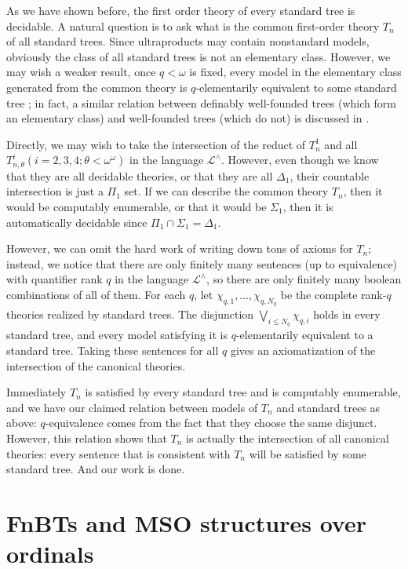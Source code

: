 \documentclass{amsart}
\theoremstyle{definition}
\begin{document}
As we have shown before, the first order theory of every standard tree is decidable. A natural question is to ask what is the common first-order theory $T_n$ of all standard trees. Since ultraproducts may contain nonstandard models, obviously the class of all standard trees is not an elementary class. However, we may wish a weaker result, once $q<\omega$ is fixed,  every model in the elementary class generated from the common theory is $q$-elementarily equivalent to some standard tree ; in fact, a similar relation between definably well-founded trees (which form an elementary class) and well-founded trees (which do not) is discussed in \cite{Doets1987}.


Directly, we may wish to take the intersection of the reduct of $T_n^1$ and all $T_{n,\theta}^{i}(i=2,3,4;\theta<\omega^\omega)$ in the language $\mathcal{L}^\wedge$. However, even though we know that they are all decidable theories, or that they are all $\Delta_1$, their countable intersection is just a $\Pi_1$ set. If we can describe the common theory $T_n$, then it would be computably enumerable, or that it would be $\Sigma_1$, then it is automatically decidable since $\Pi_1\cap\Sigma_1=\Delta_1$.

However, we can omit the hard work of writing down tons of axioms for $T_n$; instead, we notice that there are only finitely many sentences (up to equivalence) with quantifier rank $q$ in the language $\mathcal{L}^\wedge$, so there are only finitely many boolean combinations of all of them.
For each $q$, let $\chi_{q,1},\dots,\chi_{q,N_q}$ be the complete rank-$q$ theories realized by standard trees. The disjunction $\bigvee_{i\leq N_q}\chi_{q,i}$ holds in every standard tree, and every model satisfying it is $q$-elementarily equivalent to a standard tree. Taking these sentences for all $q$ gives an axiomatization of the intersection of the canonical theories.


Immediately $T_n$ is satisfied by every standard tree and is computably enumerable, and we have our claimed relation between models of $T_n$ and standard trees as above: $q$-equivalence comes from the fact that they choose the same disjunct. However, this relation shows that $T_n$ is actually the intersection of all canonical theories: every sentence that is consistent with $T_n$ will be satisfied by some standard tree. And our work is done.



\section{FnBTs and MSO structures over ordinals}
\end{document}
